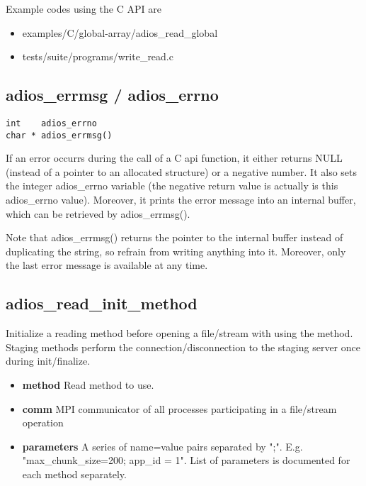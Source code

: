 \noindent Example codes using the C API are 

\begin{itemize}
\renewcommand{\labelitemi}{$-$}
\item examples/C/global-array/adios\_read\_global
\item tests/suite/programs/write\_read.c
\end{itemize}


\subsection{adios\_errmsg / adios\_errno}

\begin{lstlisting}
int    adios_errno
char * adios_errmsg()
\end{lstlisting}

\noindent If an error occurrs during the call of a C api function, it either returns NULL 
(instead of a pointer to an allocated structure) or a negative number. It also 
sets the integer adios\_errno variable (the negative return value is actually 
is this adios\_errno value). Moreover, it prints the error message into an internal 
buffer, which can be retrieved by adios\_errmsg(). 

Note that adios\_errmsg() returns the pointer to the internal buffer instead of 
duplicating the string, so refrain from writing anything into it. Moreover, only the 
last error message is available at any time.


\subsection{adios\_read\_init\_method}

Initialize a reading method before opening a file/stream with using 
the method. 
Staging methods perform the connection/disconnection to the staging server once during init/finalize.

\begin{itemize}
\item{\bf method} Read method to use.
\item{\bf comm} MPI communicator of all processes participating in a file/stream operation
\item{\bf parameters} A series of name=value pairs separated by ";".  E.g. "max\_chunk\_size=200; app\_id = 1".
List of parameters is documented for each method separately. 
\end{itemize}

